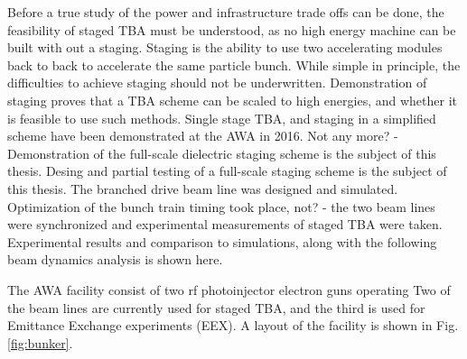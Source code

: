 \documentclass{iitthesis}
\newcommand{\lsnote}[1]{\textsf{{\color{violet}{ LS note:}   #1 }}}
\newcommand{\nrnote}[1]{\textsf{{\color{blue}{ NN note:}   #1 }}}
\begin{document}
Before a true study of the power and infrastructure trade offs 
can be done, the feasibility of staged TBA must be understood, 
as no high energy machine can be built with out a staging.
Staging is the ability to use two accelerating modules back to back to accelerate 
the same particle bunch. While simple in principle, the difficulties 
to achieve staging should not be underwritten. Demonstration of staging proves 
that a TBA scheme can be scaled to high energies, and whether it is 
feasible to use such methods. Single stage TBA, and staging 
in a simplified scheme have been demonstrated at the AWA in 2016.
\nrnote{Not any more? - Demonstration of the full-scale dielectric staging scheme is the 
	subject of this thesis.} 
Desing and partial testing of a full-scale staging scheme is the 
subject of this thesis. The branched drive beam line was designed and 
simulated. 
Optimization of the bunch train timing took place, \nrnote{not? - the two 
	beam lines were synchronized and experimental measurements 
	of staged TBA were taken. }
Experimental results and comparison to simulations, along 
with the following beam dynamics analysis is shown here.

 \label{sec:facility}

The AWA facility consist of two rf photoinjector electron guns operating
Two of the beam lines are currently used for staged TBA, and the
third is used for Emittance Exchange experiments (EEX). A layout of
the facility is shown in Fig. \ref{fig:bunker}. 
\end{document}
